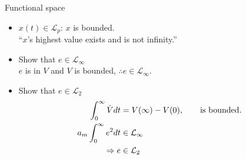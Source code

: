 \begin{example}{Functional space}
\begin{itemize}
\item $x(t) \in \mathcal{L}_p$: $x$ is bounded.\\
``$x$'s highest value exists and is not infinity.''
\item Show that $e \in \mathcal{L}_\infty$ \\
$e$ is in $V$ and $V$ is bounded, $\therefore e \in \mathcal{L}_\infty$.
\item Show that $e \in \mathcal{L}_2$ 
\begin{alignat*}{3}
\int_0^\infty \dot{V} dt &= V(\infty) - V(0), \qquad \textnormal{is bounded}.\\
a_m \int_0^\infty e^2 dt &\in \mathcal{L}_\infty\\
\Rightarrow e &\in \mathcal{L}_2
\end{alignat*}
\end{itemize}
\end{example}




